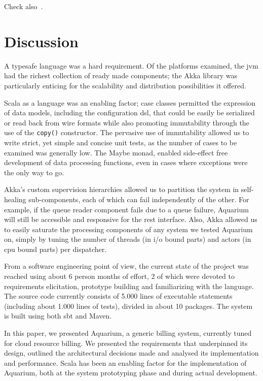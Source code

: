 \documentclass[letterpaper,twocolumn,10pt]{article}
\begin{document}
Check also~\cite{Ruiz-Agundez11}.

\section{Discussion}

A typesafe language was a hard requirement. Of the platforms examined,
the {\sc jvm} had the richest collection of ready made components; the
Akka library was particularly enticing for the scalability and
distribution possibilities it offered.

Scala as a language was an enabling factor; case classes permitted the
expression of data models, including the configuration {\sc dsl}, that
could be easily be serialized or read back from wire formats while
also promoting immutability through the use of the \texttt{copy()}
constructor. The pervasive use of immutability allowed us to write
strict, yet simple and concise unit tests, as the number of cases to
be examined was generally low. The
\textsf{Maybe} monad, enabled side-effect
free development of data processing functions, even in cases where
exceptions were the only way to go. 

Akka's custom supervision hierarchies allowed us to partition the
system in self-healing sub-components, each of which can fail
independently of the other. For example, if the queue reader component
fails due to a queue failure, Aquarium will still be accessible and
responsive for the {\sc rest} interface. Also, Akka allowed us to
easily saturate the processing components of any system we tested
Aquarium on, simply by tuning the number of threads (in {\sc i/o}
bound parts) and actors (in {\sc cpu} bound parts) per dispatcher.

From a software engineering point of view, the current state of the project was
reached using about 6 person months of effort, 2 of which were devoted to
requirements elicitation, prototype building and familiarizing with the
language. The source code currently consists of 5.000 lines of executable
statements (including about 1.000 lines of tests), divided in about 10
packages. The system is built using both {\sc sbt} and Maven. 

In this paper, we presented Aquarium, a generic billing system,
currently tuned for cloud resource billing. We presented the
requirements that underpinned its design, outlined the architectural
decisions made and analysed its implementation and performance. Scala
has been an enabling factor for the implementation of Aquarium, both
at the system prototyping phase and during actual development.
\end{document}
